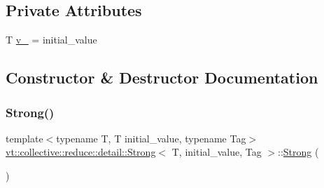 \subsection*{Private Attributes}
\begin{DoxyCompactItemize}
\item 
T \hyperlink{structvt_1_1collective_1_1reduce_1_1detail_1_1_strong_a1952e524a596e85011084327aacff707}{v\+\_\+} = initial\+\_\+value
\end{DoxyCompactItemize}


\subsection{Constructor \& Destructor Documentation}
\mbox{\label{structvt_1_1collective_1_1reduce_1_1detail_1_1_strong_af1121c0e63f347e779f1cad333792056}} 
\subsubsection{\texorpdfstring{Strong()}{Strong()}\hspace{0.1cm}{\footnotesize\ttfamily [1/2]}}
{\footnotesize\ttfamily template$<$typename T, T initial\+\_\+value, typename Tag$>$ \\
\hyperlink{structvt_1_1collective_1_1reduce_1_1detail_1_1_strong}{vt\+::collective\+::reduce\+::detail\+::\+Strong}$<$ T, initial\+\_\+value, Tag $>$\+::\hyperlink{structvt_1_1collective_1_1reduce_1_1detail_1_1_strong}{Strong} (\begin{DoxyParamCaption}{ }\end{DoxyParamCaption})\hspace{0.3cm}{\ttfamily [default]}}

\mbox{\label{structvt_1_1collective_1_1reduce_1_1detail_1_1_strong_ad7d4a59581e1961b643c853c8e7c58c3}} 

